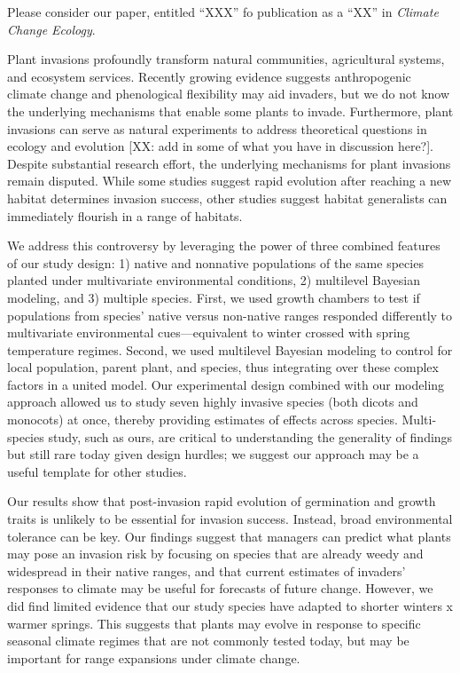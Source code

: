 \documentclass[11pt]{article}
\begin{document}
	\medskip
	Please consider our paper, entitled “XXX” fo publication as a “XX” in \textit{Climate Change Ecology}. \par
	Plant invasions profoundly transform natural communities, agricultural systems, and ecosystem services. Recently growing evidence suggests anthropogenic climate change and phenological flexibility may aid invaders, but we do not know the underlying mechanisms that enable some plants to invade. Furthermore, plant invasions can serve as natural experiments to address theoretical questions in ecology and evolution [XX: add in some of what you have in discussion here?].  Despite substantial research effort, the underlying mechanisms for plant invasions remain disputed. While some studies suggest rapid evolution after reaching a new habitat determines invasion success, other studies suggest habitat generalists can immediately flourish in a range of habitats.\par 
	We address this controversy by leveraging the power of three combined features of our study design: 1) native and nonnative populations of the same species planted under multivariate environmental conditions, 2) multilevel Bayesian modeling, and 3) multiple species. First, we used growth chambers to test if populations from species' native versus non-native ranges responded differently to multivariate environmental cues---equivalent to winter crossed with spring temperature regimes. Second, we used multilevel Bayesian modeling to control for local population, parent plant, and species, thus integrating over these complex factors in a united model. Our experimental design combined with our modeling approach allowed us to study seven highly invasive species (both dicots and monocots) at once, thereby providing estimates of effects across species. Multi-species study, such as ours, are critical to understanding the generality of findings but still rare today given design hurdles; we suggest our approach may be a useful template for other studies.  \par %
	Our results show that post-invasion rapid evolution of germination and growth traits is unlikely to be essential for invasion success. Instead, broad environmental tolerance can be key. Our findings suggest that managers can predict what plants may pose an invasion risk by focusing on species that are already weedy and widespread in their native ranges, and that current estimates of invaders' responses to climate may be useful for forecasts of future change. However, we did find limited evidence that our study species have adapted to shorter winters x warmer springs. This suggests that plants may evolve in response to specific seasonal climate regimes that are not commonly tested today, but may be important for range expansions under climate change. 
\end{document}

